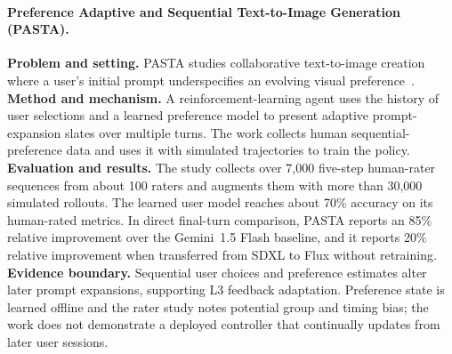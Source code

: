 \paragraph{Preference Adaptive and Sequential Text-to-Image Generation (PASTA).}
\textbf{Problem and setting.} PASTA studies collaborative text-to-image creation where a user's initial prompt underspecifies an evolving visual preference~\cite{nabati2025pasta}. \textbf{Method and mechanism.} A reinforcement-learning agent uses the history of user selections and a learned preference model to present adaptive prompt-expansion slates over multiple turns. The work collects human sequential-preference data and uses it with simulated trajectories to train the policy. \textbf{Evaluation and results.} The study collects over 7,000 five-step human-rater sequences from about 100 raters and augments them with more than 30,000 simulated rollouts. The learned user model reaches about 70\% accuracy on its human-rated metrics. In direct final-turn comparison, PASTA reports an 85\% relative improvement over the Gemini~1.5 Flash baseline, and it reports 20\% relative improvement when transferred from SDXL to Flux without retraining. \textbf{Evidence boundary.} Sequential user choices and preference estimates alter later prompt expansions, supporting L3 feedback adaptation. Preference state is learned offline and the rater study notes potential group and timing bias; the work does not demonstrate a deployed controller that continually updates from later user sessions.

